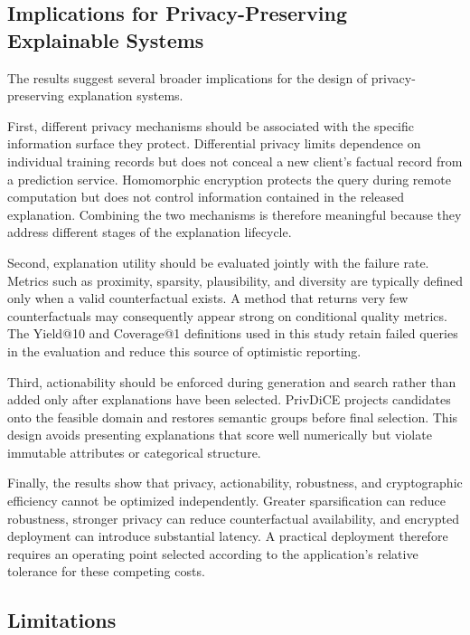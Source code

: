 \documentclass[preprint,12pt]{elsarticle}
\begin{document}
\subsection{Implications for Privacy-Preserving Explainable Systems}
\label{subsec:discussion_implications}

The results suggest several broader implications for the design of
privacy-preserving explanation systems.

First, different privacy mechanisms should be associated with the specific
information surface they protect. Differential privacy limits dependence on
individual training records but does not conceal a new client's factual record
from a prediction service. Homomorphic encryption protects the query during
remote computation but does not control information contained in the released
explanation. Combining the two mechanisms is therefore meaningful because they
address different stages of the explanation lifecycle.

Second, explanation utility should be evaluated jointly with the failure rate.
Metrics such as proximity, sparsity, plausibility, and diversity are typically
defined only when a valid counterfactual exists. A method that returns very few
counterfactuals may consequently appear strong on conditional quality metrics.
The Yield@10 and Coverage@1 definitions used in this study retain failed queries
in the evaluation and reduce this source of optimistic reporting.

Third, actionability should be enforced during generation and search rather than
added only after explanations have been selected. PrivDiCE projects candidates
onto the feasible domain and restores semantic groups before final selection.
This design avoids presenting explanations that score well numerically but
violate immutable attributes or categorical structure.

Finally, the results show that privacy, actionability, robustness, and
cryptographic efficiency cannot be optimized independently. Greater
sparsification can reduce robustness, stronger privacy can reduce
counterfactual availability, and encrypted deployment can introduce substantial
latency. A practical deployment therefore requires an operating point selected
according to the application's relative tolerance for these competing costs.


\subsection{Limitations}
\label{subsec:limitations}
\end{document}
